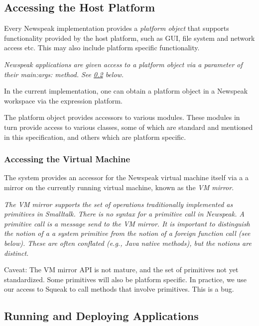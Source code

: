 \documentclass{article}
\newcommand{\code}[1]{{\sf #1}}
\begin{document}
\subsection{Accessing the Host Platform}
\label{platform}

Every Newspeak implementation provides a {\em platform object} that supports functionality
provided by the host platform, such as GUI, file system and network access etc. This may also include platform specific functionality. 

{\it Newspeak applications are given access to a platform object via a parameter of their \code{main:args:} method. See \ref{deploy} below.

In the current implementation, one can obtain a platform object in a Newspeak workspace via the expression \code{platform}. 
}

The platform object provides accessors to various modules.  These modules in turn provide access to various classes, some of which are standard and mentioned in this specification, and others which are platform specific.


\subsubsection{Accessing the Virtual Machine}
\label{vm}

The system provides an accessor for the Newspeak virtual machine itself via a
a mirror on the currently running virtual machine, known as the {\em VM mirror}. 

{\it 
The VM mirror supports the set of operations traditionally implemented as primitives in Smalltalk. There is no syntax for a primitive call in Newspeak. A primitive call is a message send to the VM mirror.
It is important to distinguish the notion of a a system primitive from the notion of a foreign function call (see below). These are often conflated (e.g., Java native methods), but the notions are distinct.

Caveat: The VM mirror API is not mature, and the set of primitives not yet standardized. Some primitives will also be platform specific. In practice, we use our access to Squeak to call methods that involve primitives. This is a bug.
}

\subsection{Running and Deploying Applications}
\label{deploy}
\end{document}
